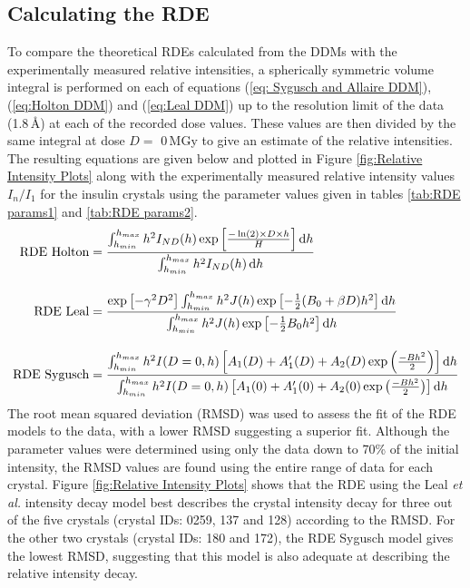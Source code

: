 \subsection{Calculating the RDE}
\label{sub:Calculating the RDE}
To compare the theoretical RDEs calculated from the DDMs with the experimentally measured relative intensities, a spherically symmetric volume integral is performed on each of equations (\ref{eq: Sygusch and Allaire DDM}), (\ref{eq:Holton DDM}) and (\ref{eq:Leal DDM}) up to the resolution limit of the data (1.8$\,$\AA) at each of the recorded dose values.
These values are then divided by the same integral at dose $D =$ 0$\,$MGy to give an estimate of the relative intensities.
The resulting equations are given below and plotted in Figure \ref{fig:Relative Intensity Plots} along with the experimentally measured relative intensity values $I_n/I_1$ for the insulin crystals using the parameter values given in tables \ref{tab:RDE params1} and \ref{tab:RDE params2}.
\begin{align}
\text{RDE Holton} &= \frac{\int^{h_{max}}_{h_{min}}{h^2 I_{ND}(h) \exp \left[ \frac{- \ln(2) \times D \times h}{H}\right]}\, \mathrm{d} h}{\int^{h_{max}}_{h_{min}}{h^2 I_{ND}(h)}\, \mathrm{d} h} \label{eqrdeholt}\\[10pt]
\text{RDE Leal} &= \frac{\exp\left[ -\gamma^2 D^2 \right] \int^{h_{max}}_{h_{min}}{h^2 J(h) \exp\left[ -\frac{1}{2}(B_0 + \beta D)h^2\right]}\, \mathrm{d} h }{\int^{h_{max}}_{h_{min}}{h^2 J(h) \exp\left[ -\frac{1}{2} B_0 h^2\right]}\, \mathrm{d} h }  \label{eqrdeleal}\\[10pt]
\text{RDE Sygusch} &= \frac{\int^{h_{max}}_{h_{min}}{h^2 I(D=0,h) \left[ A_1(D) + A'_1(D) + A_2(D) \exp\left( \frac{-B h^2}{2}\right)\right]}\, \mathrm{d} h}{\int^{h_{max}}_{h_{min}}{h^2 I(D=0,h) \left[ A_1(0) + A'_1(0) + A_2(0) \exp\left( \frac{-B h^2}{2}\right)\right]}\, \mathrm{d} h} \label{eqrdesyg}
\end{align}
The root mean squared deviation (RMSD) was used to assess the fit of the RDE models to the data, with a lower RMSD suggesting a superior fit.
Although the parameter values were determined using only the data down to 70\% of the initial intensity, the RMSD values are found using the entire range of data for each crystal.
Figure \ref{fig:Relative Intensity Plots} shows that the RDE using the Leal \textit{et al.} intensity decay model best describes the crystal intensity decay for three out of the five crystals (crystal IDs: 0259, 137 and 128) according to the RMSD.
For the other two crystals (crystal IDs: 180 and 172), the RDE Sygusch model gives the lowest RMSD, suggesting that this model is also adequate at describing the relative intensity decay.

